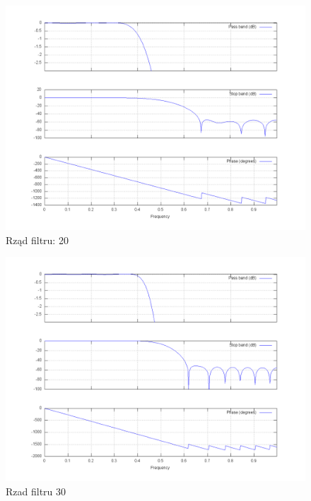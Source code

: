 \documentclass[wide,a4paper,titlepage,12pt]{mwart}
\begin{document}
	\begin{landscape}
	  \begin{figure}[htbp]
	    \begin{center}
	      \includegraphics[scale=.5]{out/fig3.png}
	      \caption{\label{fig3}  Rząd filtru: 20}
	    \end{center}
	  \end{figure}
	\end{landscape}
	
	\begin{landscape}
	  \begin{figure}[htbp]
	    \begin{center}
	      \includegraphics[scale=.5]{out/fig4.png}
	      \caption{\label{fig4} Rzad filtru 30}
	    \end{center}
	  \end{figure}
	\end{landscape}
	
\end{document}

